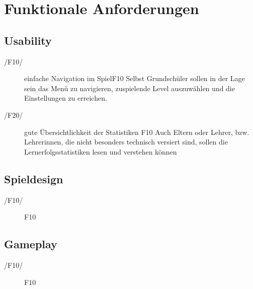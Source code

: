 \section{Funktionale Anforderungen}

\subsection{Usability}

\begin{description}
	\item[/F10/] einfache Navigation im Spiel{F10} \newline
	Selbst Grundschüler sollen in der Lage sein das Menü zu navigieren, zuspielende Level auszuwählen und die Einstellungen zu erreichen.
	\item[/F20/] gute Übersichtlichkeit der Statistiken {F10} \newline
	Auch  Eltern oder Lehrer, bzw. Lehrerinnen, die nicht besonders technisch versiert sind, sollen die Lernerfolgsstatistiken lesen und verstehen können
\end{description}

\subsection{Spieldesign}

\begin{description}
	\item[/F10/] {F10} \newline
\end{description}


\subsection{Gameplay}

\begin{description}
	\item[/F10/] {F10} \newline
\end{description}